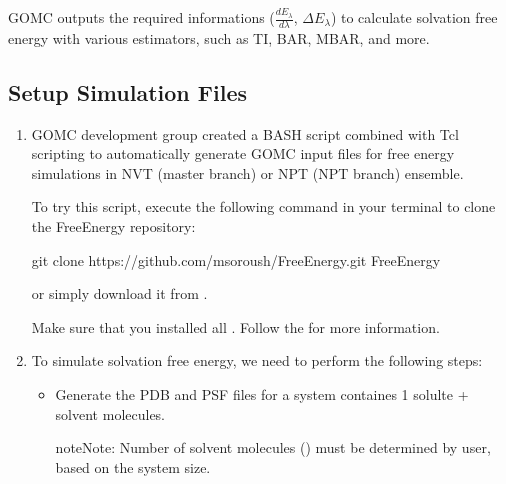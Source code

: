 \documentclass[letterpaper,10pt,english]{sphinxmanual}
\begin{document}
GOMC outputs the required informations (\(\frac{dE_{\lambda}}{d\lambda}\), \(\Delta E_{\lambda}\))
to calculate solvation free energy with various estimators, such as TI, BAR, MBAR, and more.


\subsection{Setup Simulation Files}
\label{\detokenize{howto:setup-simulation-files}}\begin{enumerate}
%
\item {} 

GOMC development group created a BASH script combined with Tcl scripting to automatically
generate GOMC input files for free energy simulations in NVT (master branch) or NPT (NPT branch) ensemble.

To try this script, execute the following command in your terminal to clone the FreeEnergy repository:

\begin{sphinxVerbatim}[commandchars=\\\{\}]
\PYGZdl{} git  clone    https://github.com/msoroush/FreeEnergy.git
\PYGZdl{}    FreeEnergy
\end{sphinxVerbatim}

or simply download it from  .

Make sure that you installed all . Follow the
 for more information.

\item {} 

To simulate solvation free energy, we need to perform the following steps:
\begin{itemize}
\item {} 
Generate the PDB and PSF files for a system containes 1 solulte +  solvent molecules.

\begin{sphinxadmonition}{note}{Note:}
Number of solvent molecules () must be determined by user, based on the system size.
\end{sphinxadmonition}


\end{itemize}
\end{enumerate}
\end{document}
